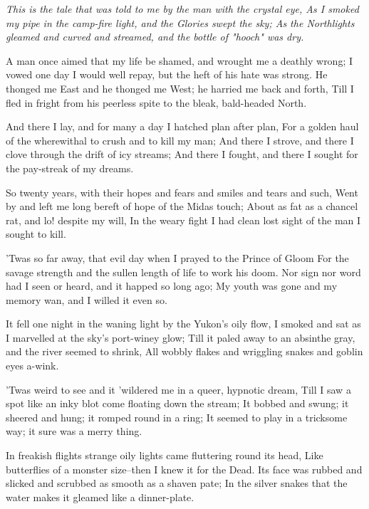 
\begin{poemblock}
\textit{
This is the tale that was told to me by the man with the crystal eye,
  As I smoked my pipe in the camp-fire light,
and the Glories swept the sky;
  As the Northlights gleamed and curved and streamed,
and the bottle of "hooch" was dry.
}

 A man once aimed that my life be shamed, and wrought me a deathly wrong;
 I vowed one day I would well repay, but the heft of his hate was strong.
 He thonged me East and he thonged me West; he harried me back and forth,
 Till I fled in fright from his peerless spite
   to the bleak, bald-headed North.

 And there I lay, and for many a day I hatched plan after plan,
 For a golden haul of the wherewithal to crush and to kill my man;
 And there I strove, and there I clove through the drift of icy streams;
 And there I fought, and there I sought for the pay-streak of my dreams.

 So twenty years, with their hopes and fears and smiles and tears and such,
 Went by and left me long bereft of hope of the Midas touch;
 About as fat as a chancel rat, and lo! despite my will,
 In the weary fight I had clean lost sight of the man I sought to kill.

 'Twas so far away, that evil day when I prayed to the Prince of Gloom
 For the savage strength and the sullen length of life to work his doom.
 Nor sign nor word had I seen or heard, and it happed so long ago;
 My youth was gone and my memory wan, and I willed it even so.

 It fell one night in the waning light by the Yukon's oily flow,
 I smoked and sat as I marvelled at the sky's port-winey glow;
 Till it paled away to an absinthe gray, and the river seemed to shrink,
 All wobbly flakes and wriggling snakes and goblin eyes a-wink.

 'Twas weird to see and it 'wildered me in a queer, hypnotic dream,
 Till I saw a spot like an inky blot come floating down the stream;
 It bobbed and swung; it sheered and hung; it romped round in a ring;
 It seemed to play in a tricksome way; it sure was a merry thing.

 In freakish flights strange oily lights came fluttering round its head,
 Like butterflies of a monster size--then I knew it for the Dead.
 Its face was rubbed and slicked and scrubbed as smooth as a shaven pate;
 In the silver snakes that the water makes it gleamed like a dinner-plate.


\end{poemblock}
